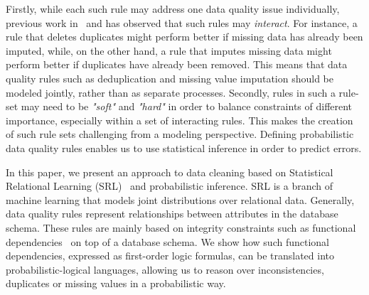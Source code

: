 Firstly, while each such rule may address one data quality issue individually, previous work in~\cite{fan2012foundations} and \cite{Fan:2014:IRM:2628135.2567657} has observed that such rules may \textit{interact}. For instance, a rule that deletes duplicates might perform better if missing data has already been imputed, while, on the other hand, a rule that imputes missing data might perform better if duplicates have already been removed. This means that data quality rules such as deduplication and missing value imputation should be modeled jointly, rather than as separate processes.
Secondly, rules in such a rule-set may need to be \textit{"soft"} and \textit{"hard"} in order to balance constraints of different importance, especially within a set of interacting rules. This makes the creation of such rule sets challenging from a modeling perspective. Defining probabilistic data quality rules enables us to use statistical inference in order to predict errors. 


In this paper, we present an approach to data cleaning based on Statistical Relational Learning (SRL)~\cite{getoor2007introduction} and probabilistic inference. SRL is a branch of machine learning that models joint distributions over relational data. Generally, data quality rules represent relationships between attributes in the database schema. These rules are mainly based on integrity constraints such as functional dependencies~\cite{AbiteboulHV95} on top of a database schema. We show how such functional dependencies, expressed as first-order logic formulas, can be translated into probabilistic-logical languages, allowing us to reason over inconsistencies, duplicates or missing values in a probabilistic way.

 

